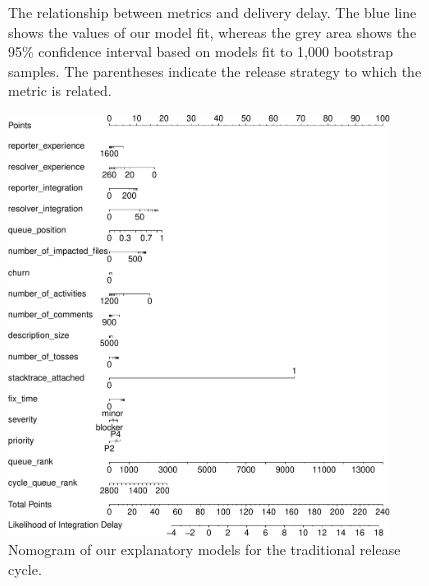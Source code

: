 \begin{sloppypar}
\begin{figure}[t]
	\caption{The relationship between metrics and delivery delay. The blue
		line shows the values of our model fit, whereas the grey
		area shows the 95\% confidence interval based on models fit to
		1,000 bootstrap samples. The parentheses indicate the
		release strategy to which the metric is related.
	}
\end{figure}

\begin{figure}[!]
	\centering
	\includegraphics[width=0.90\textwidth,keepaspectratio]
	{chapters/chapter5/figures/rq3/nomogram_trad.pdf}
	\caption{Nomogram of our explanatory models for the traditional release cycle.}
	\label{fig:nomogram_trad}
\end{figure}


\end{sloppypar}
